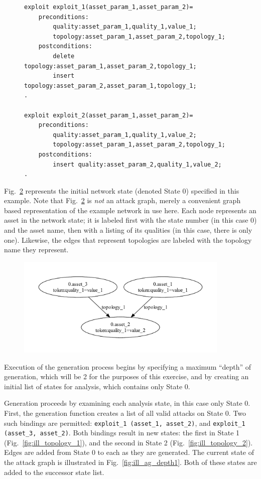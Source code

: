 \begin{figure}
\begin{lstlisting}
exploit exploit_1(asset_param_1,asset_param_2)=
    preconditions:
        quality:asset_param_1,quality_1,value_1;
        topology:asset_param_1,asset_param_2,topology_1;
    postconditions:
        delete topology:asset_param_1,asset_param_2,topology_1;
        insert topology:asset_param_2,asset_param_1,topology_1;
.

exploit exploit_2(asset_param_1,asset_param_2)=
    preconditions:
        quality:asset_param_1,quality_1,value_2;
        topology:asset_param_1,asset_param_2,topology_1;
    postconditions:
        insert quality:asset_param_2,quality_1,value_2;
.
\end{lstlisting}
\label{fig:ill_xp}
\end{figure}

Fig.~\ref{fig:ill_topology_0} represents the initial network state 
(denoted State 0) specified
in this example. Note that Fig.~\ref{fig:ill_topology_0} is \emph{not} an attack
graph, merely a convenient graph based representation of the example network
in use here. Each node represents an asset in the network state; it is labeled
first with the state number (in this case 0) and the asset name, then with a
listing of its qualities (in this case, there is only one).
Likewise, the edges that represent topologies
are labeled with the topology name they represent.

\begin{figure}
\includegraphics[width=4in]{ag_illustrative_simple/nm_state0}
\label{fig:ill_topology_0}
\end{figure}

Execution of the generation process begins by specifying a maximum ``depth''
of generation, which will be 2 for the purposes of this exercise, and by creating
an initial list of states for analysis, which contains only State 0.

Generation proceeds by examining each analysis state, in this case only State 0.
First, the generation function creates a list of all valid
attacks on State 0. Two such bindings are permitted: \texttt{exploit\_1 (asset\_1, asset\_2)},
and \texttt{exploit\_1 (asset\_3, asset\_2)}. Both bindings result in new states:
the first in State 1 (Fig.~\ref{fig:ill_topology_1}), and the second in State 2
(Fig.~\ref{fig:ill_topology_2}). Edges are added from State 0 to each as they are
generated. The current state of the attack graph is illustrated in 
Fig.~\ref{fig:ill_ag_depth1}. Both of these states are added to the
successor state list.

